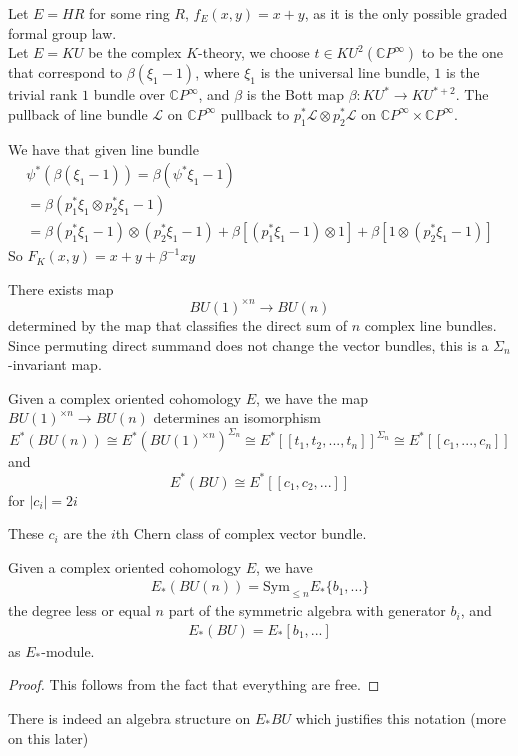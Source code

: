 \begin{example}
    Let $E=HR$ for some ring $R$, $f_E(x,y)=x+y$, as it is the only possible graded formal group law.
   \\ Let $E=KU$ be the complex $K$-theory, we choose $t\in KU^2(\mathbb{C}P^\infty)$ to be the one that correspond to $\beta(\xi_1-1)$, where $\xi_1$ is the universal line bundle, $1$ is the trivial rank $1$ bundle over $\mathbb{C}P^\infty$, and $\beta$ is the Bott map $\beta: KU^*\to KU^{*+2}$. The pullback of line bundle $\mathcal{L}$ on $\mathbb{C}P^\infty$ pullback to $p_1^*\mathcal{L}\otimes p_2^*\mathcal{L}$ on $\mathbb{C}P^\infty\times \mathbb{C}P^\infty$.
   
   We have that given line bundle
    \begin{align*}
\psi^*(\beta(\xi_1-1))= \beta(\psi^*\xi_1-1)
\\= \beta(p_1^*\xi_1\otimes p_2^*\xi_1-1)
\\=\beta(p_1^*\xi_1-1)\otimes  (p_2^*\xi_1-1)+ \beta[(p_1^*\xi_1-1)\otimes 1 ]+  \beta[1\otimes (p_2^*\xi_1-1)]
    \end{align*} So $F_K(x,y)=x+y+\beta^{-1}xy $
\end{example}

There exists map
\[
    BU(1)^{\times n}\to BU(n)
\]determined by the map that classifies the direct sum of $n$ complex line bundles. Since permuting direct summand does not change the vector bundles, this is a $\Sigma_n$-invariant map.

\begin{proposition}
    \cite{PreSwitzer}\cite{ChrLurie}
Given a complex oriented cohomology $E$, we have the map $  BU(1)^{\times n}\to BU(n)$ determines an isomorphism 
\[
E^*(BU(n))\cong E^*(BU(1)^{\times n})^{\Sigma_n}\cong E^*[[t_1, t_2,...,t_n]]^{\Sigma_n}\cong E^*[[c_1,...,c_n]]
\]
and 
\[
E^*(BU)\cong E^*[[c_1,c_2,...]]
\]for $|c_i|=2i$
\end{proposition}

These $c_i$ are the $i$th Chern class of complex vector bundle.

\begin{proposition}
    Given a complex oriented cohomology $E$, we have 
    \begin{align*}
        E_*(BU(n))=\mathrm{Sym}_{\leq n}E_*\{b_1,...\}
    \end{align*}the degree less or equal $n$ part of the symmetric algebra with generator $b_i$, and
    \begin{align*}
        E_*(BU)= E_*[b_1,...]
    \end{align*} 
    as $E_*$-module.
\end{proposition}
\begin{proof}
This follows from the fact that everything are free.
\end{proof}
There is indeed an algebra structure on $E_*BU$ which justifies this notation (more on this later)